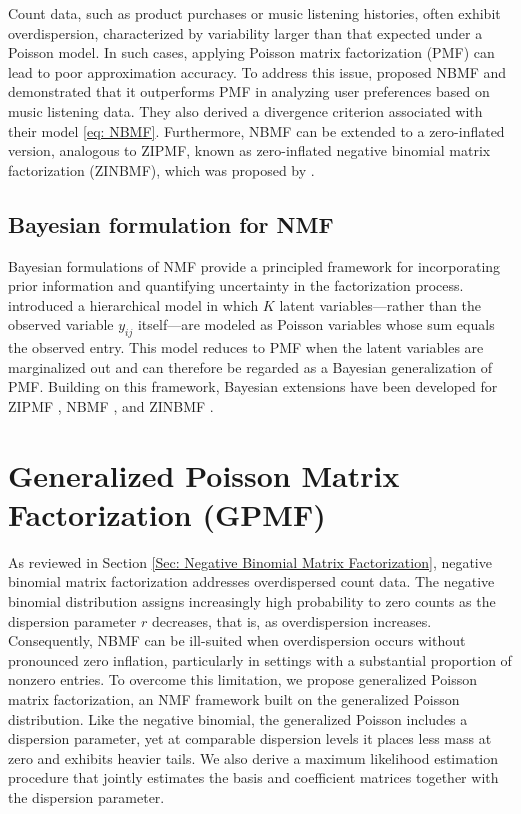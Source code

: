 \documentclass[pdflatex,sn-basic]{sn-jnl}%
\theoremstyle{thmstyleone}%
\theoremstyle{thmstyletwo}%
\theoremstyle{thmstylethree}%
\begin{document}
Count data, such as product purchases or music listening histories, often exhibit overdispersion, characterized by variability larger than that expected under a Poisson model.  
In such cases, applying Poisson matrix factorization (PMF) can lead to poor approximation accuracy.  
To address this issue, \citet{Gouvert2020} proposed NBMF and demonstrated that it outperforms PMF in analyzing user preferences based on music listening data.  
They also derived a divergence criterion associated with their model \eqref{eq: NBMF}.  
Furthermore, NBMF can be extended to a zero-inflated version, analogous to ZIPMF, known as zero-inflated negative binomial matrix factorization (ZINBMF), which was proposed by \citet{Abe2018,Abe2019}.

\subsection{Bayesian formulation for NMF}
Bayesian formulations of NMF provide a principled framework for incorporating prior information and quantifying uncertainty in the factorization process.  
\citet{cemgil2009bayesian} introduced a hierarchical model in which $K$ latent variables---rather than the observed variable $y_{ij}$ itself---are modeled as Poisson variables whose sum equals the observed entry.  
This model reduces to PMF when the latent variables are marginalized out and can therefore be regarded as a Bayesian generalization of PMF.  
Building on this framework, Bayesian extensions have been developed for ZIPMF \citep{simchowitz2013zero}, NBMF \citep{Gouvert2018}, and ZINBMF \citep{Abe2018}.  


\section{Generalized Poisson Matrix Factorization (GPMF)}\label{Sec: Generalized Poisson Matrix Factorization}
As reviewed in Section \ref{Sec: Negative Binomial Matrix Factorization}, negative binomial matrix factorization addresses overdispersed count data. The negative binomial distribution assigns increasingly high probability to zero counts as the dispersion parameter $r$ decreases, that is, as overdispersion increases. Consequently, NBMF can be ill-suited when overdispersion occurs without pronounced zero inflation, particularly in settings with a substantial proportion of nonzero entries. To overcome this limitation, we propose generalized Poisson matrix factorization, an NMF framework built on the generalized Poisson distribution. Like the negative binomial, the generalized Poisson includes a dispersion parameter, yet at comparable dispersion levels it places less mass at zero and exhibits heavier tails. We also derive a maximum likelihood estimation procedure that jointly estimates the basis and coefficient matrices together with the dispersion parameter.
\end{document}

